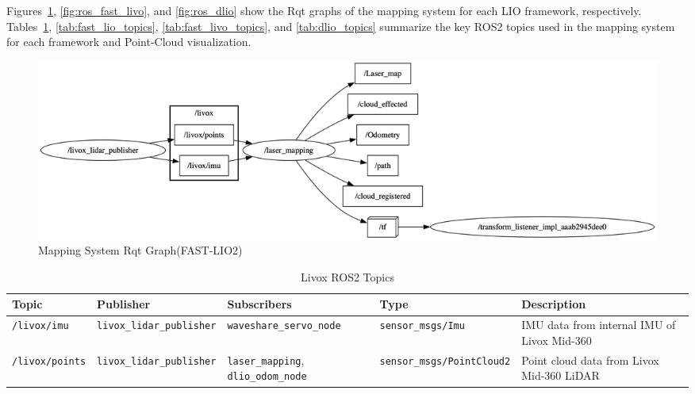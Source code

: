 \documentclass[english, bachelor, utf8]{base/thesis_telematics}
\begin{document}
Figures~\ref{fig:ros_fast_lio}, \ref{fig:ros_fast_livo}, and \ref{fig:ros_dlio} show the Rqt graphs of the mapping system for each LIO framework, respectively.
Tables~\ref{tab:Livox_topics}, \ref{tab:fast_lio_topics}, \ref{tab:fast_livo_topics}, and \ref{tab:dlio_topics} summarize the key ROS2 topics used in the mapping system for each framework and Point-Cloud visualization.
\begin{figure}[H]
    \centering
    \includegraphics[width=\textwidth]{pics/rqt/ros_fast_lio.png}
    \caption{Mapping System Rqt Graph(FAST-LIO2)}
    \label{fig:ros_fast_lio}
\end{figure}




\begin{table}[ht]
\centering
\caption{Livox ROS2 Topics}
\label{tab:Livox_topics}
\scriptsize  %
\begin{tabularx}{\textwidth}{@{}llXlX@{}}
\toprule
\textbf{Topic} & \textbf{Publisher} & \textbf{Subscribers} & \textbf{Type} & \textbf{Description} \\
\midrule
\texttt{/livox/imu} & \texttt{livox\_lidar\_publisher} & \texttt{waveshare\_servo\_node} & \texttt{sensor\_msgs/Imu} & IMU data from internal IMU of Livox Mid-360 \\[0.3em]
\texttt{/livox/points} & \texttt{livox\_lidar\_publisher} & \texttt{laser\_mapping}, \texttt{dlio\_odom\_node} & \texttt{sensor\_msgs/PointCloud2} & Point cloud data from Livox Mid-360 LiDAR \\
\bottomrule
\end{tabularx}
\end{table}
\end{document}
